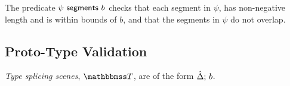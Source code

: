 
The predicate $\psi~\mathsf{segments}~b$ checks that each segment in $\psi$, has non-negative length and is within bounds of $b$, and that the segments in $\psi$ do not overlap.


\subsection{Proto-Type Validation}
\emph{Type splicing scenes}, $\tscenev$, are of the form $\hat{\Delta};\,b$.

